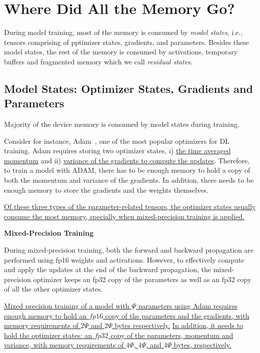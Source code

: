 \section{Where Did All the Memory Go?}

During model training, most of the memory is consumed by {\it model states}, i.e., tensors comprising of pptimizer states, gradients, and parameters. Besides these model states, the rest of the memory is consumed by activations, temporary buffers and fragmented memory which we call \emph{residual states}.

\subsection{Model States: Optimizer States, Gradients and Parameters}

Majority of the device memory is consumed by model states during training.

Consider for instance, Adam~\cite{DBLP:journals/corr/Adam}, one of the most popular optimizers for DL training. Adam requires storing two optimizer states, i) \uline{the time averaged momentum} and ii) \uline{variance of the gradients to compute the updates}. Therefore, to train a model with ADAM, there has to be enough memory to hold a copy of both the momentum and variance of the gradients. In addition, there needs to be enough memory to store the gradients and the weights themselves.

\uline{Of these three types of the parameter-related tensors, the optimizer states usually consume the most memory, specially when mixed-precision training is applied.}

\textbf{Mixed-Precision Training}

During mixed-precision training, both the forward and backward propagation are performed using fp16 weights and activations. However, to effectively compute and apply the updates at the end of the backward propagation, the mixed-precision optimizer keeps an fp32 copy of the parameters as well as an fp32 copy of all the other optimizer states.

\uline{Mixed precision training of a model with $\Psi$ parameters using Adam requires enough memory to hold an $fp16$ copy of the parameters and the gradients, with memory requirements of $2\Psi$ and $2\Psi$ bytes respectively.} \uline{In addition, it needs to hold the optimizer states: an $fp32$ copy of the parameters, momentum and variance, with memory requirements of $4\Psi$, $4\Psi$, and $4\Psi$ bytes, respectively.}

